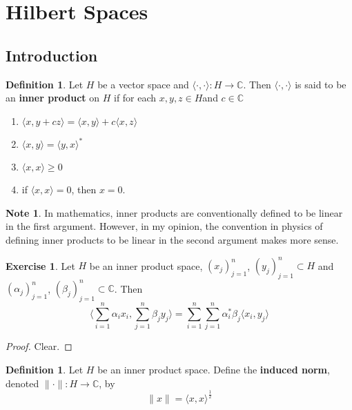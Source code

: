\documentclass[12pt]{amsart}
\theoremstyle{definition}
\newtheorem{defn}[definition]{Definition}
\newtheorem{note}[definition]{Note}
\newtheorem{ex}[definition]{Exercise}
\newcommand{\al}{\alpha}
\newcommand{\be}{\beta}
\newcommand{\C}{\mathbb{C}}
\newcommand{\tbf}[1]{\textbf{#1}}
\renewcommand{\r}{\rangle}
\renewcommand{\l}{\langle}
\DeclareMathOperator*{\0}{\mbf{0}}
\DeclareMathOperator*{\1}{\mbf{1}}
\newcommand{\lex}[1]{\label{ex:#1}}
\newcommand{\ld}[1]{\label{defn:#1}}
\begin{document}
	
	
	
	
	
	
	
	
	
	
	\newpage
	\section{Hilbert Spaces}
	
	\subsection{Introduction}
	
	\begin{defn} \ld{}
		Let $H$ be a vector space and $\l \cdot, \cdot \r: H \rightarrow \C$. Then $\l \cdot, \cdot \r$ is said to be an \tbf{inner product} on $H$ if for each $x,y,z \in H$and $c \in \C$
		\begin{enumerate}
			\item $\l x , y + cz\r = \l x , y \r + c\l x , z\r $
			\item $\l x , y \r = \l y , x\r^*$
			\item $\l x , x \r \geq 0$
			\item if $\l x ,x \r = 0$, then $x = 0$.  
		\end{enumerate}
	\end{defn}
	
	\begin{note}
	In mathematics, inner products are conventionally defined to be linear in the first argument. However, in my opinion, the convention in physics of defining inner products to be linear in the second argument makes more sense.
	\end{note}
	 
	\begin{ex} \lex{}
	Let $H$ be an inner product space, $(x_j)_{j =1}^n$, $(y_j)_{j =1}^n \subset H$ and $(\al_j)_{j=1}^n$, $(\be_j)_{j=1}^n \subset \C$. Then $$\bigg \l \sum_{i=1}^n \al_i x_i , \sum_{j=1}^n \be_j y_j \bigg \r = \sum_{i=1}^n \sum_{j=1}^n \al_i^*\be_j \l x_i , y_j \r $$
\end{ex}

\begin{proof}
Clear.
\end{proof}

\begin{defn} \ld{}
Let $H$ be an inner product space. Define the \tbf{induced norm}, denoted $\|\cdot \|: H \rightarrow \C$, by $$\|x\| = \l x, x\r^{\frac{1}{2}}$$
\end{defn}
\end{document}

